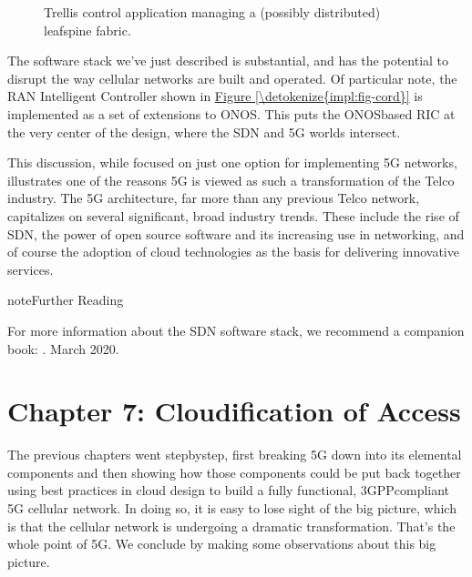 \documentclass[a4paper,11pt,english]{sphinxmanual}
\let\sphinxpxdimen\pdfpxdimen\else\newdimen\sphinxpxdimen
\begin{document}
\begin{figure}[ht]
\centering
\capstart

\noindent\sphinxincludegraphics[width=600\sphinxpxdimen]{{Slide31}.png}
\caption{Trellis control application managing a (possibly
distributed) leaf\sphinxhyphen{}spine fabric.}\label{\detokenize{impl:id3}}\label{\detokenize{impl:fig-trellis}}\end{figure}

\sphinxAtStartPar
The software stack we’ve just described is substantial, and has the
potential to disrupt the way cellular networks are built and operated.
Of particular note, the RAN Intelligent Controller
shown in \hyperref[\detokenize{impl:fig-cord}]{Figure \ref{\detokenize{impl:fig-cord}}} is implemented as a set of
extensions to ONOS.  This puts the ONOS\sphinxhyphen{}based RIC at the very center
of the design, where the SDN and 5G worlds intersect.

\sphinxAtStartPar
This discussion, while focused on just one option for implementing 5G
networks, illustrates one of the reasons 5G is viewed as such a
transformation of the Telco industry. The 5G architecture, far more
than any previous Telco network, capitalizes on several significant, broad
industry trends. These include the rise of SDN, the power of open source
software and its increasing use in networking, and of course the
adoption of cloud technologies as the basis for delivering innovative services.

\label{\detokenize{impl:reading-sdn}}
\begin{sphinxadmonition}{note}{Further Reading}

\sphinxAtStartPar
For more information about the SDN software stack, we recommend a
companion book: . March 2020.
\end{sphinxadmonition}


\chapter{Chapter 7:  Cloudification of Access}
\label{\detokenize{cloud:chapter-7-cloudification-of-access}}\label{\detokenize{cloud::doc}}
\sphinxAtStartPar
The previous chapters went step\sphinxhyphen{}by\sphinxhyphen{}step, first breaking 5G down into its
elemental components and then showing how those components could be put
back together using best practices in cloud design to build a fully
functional, 3GPP\sphinxhyphen{}compliant 5G cellular network. In doing so, it is easy
to lose sight of the big picture, which is that the cellular network is
undergoing a dramatic transformation. That’s the whole point of 5G. We
conclude by making some observations about this big picture.
\end{document}
